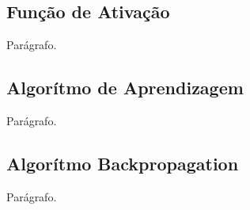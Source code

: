 \subsection{Função de Ativação}

Parágrafo.


\subsection{Algorítmo de Aprendizagem}

Parágrafo.


\subsection{Algorítmo Backpropagation}

Parágrafo.
